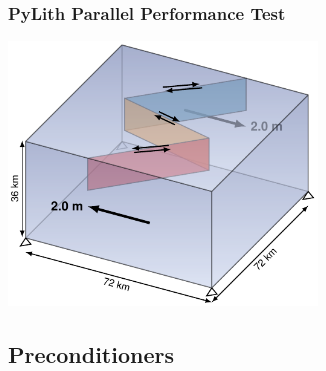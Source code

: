 \documentclass{beamer}
\begin{document}
\begin{frame}
  \frametitle{PyLith Parallel Performance Test}

  \begin{center}
    \includegraphics[height=7.0cm]{figs/solvertest_geometry}
  \end{center}

\end{frame}


\subsection{Preconditioners}
\end{document}
